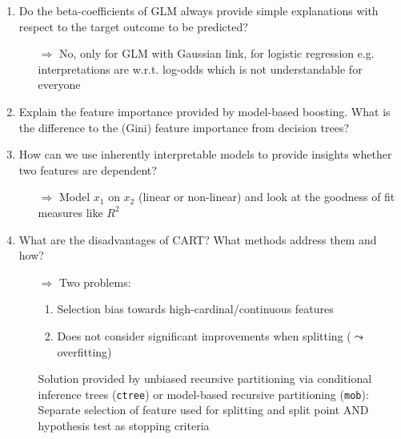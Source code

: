 \begin{enumerate}
\begin{itemize}
    	\end{itemize}
    	\item Do the beta-coefficients of GLM always provide simple explanations with respect to the target outcome to be predicted? 
    	\begin{itemize}
    		\item[$\Rightarrow$] No, only for GLM with Gaussian link, for logistic regression e.g. interpretations are w.r.t. log-odds which is not understandable for everyone
    	\end{itemize}
    	\item Explain the feature importance provided by model-based boosting. What is the difference to the (Gini) feature importance from decision trees?
    	\item How can we use inherently interpretable models to provide insights whether two features are dependent?
    	\begin{itemize}
    		\item[$\Rightarrow$] Model $x_1$ on $x_2$ (linear or non-linear) and look at the goodness of fit measures like $R^2$
    	\end{itemize}
    	\item What are the disadvantages of CART? What methods address them and how?
    	\begin{itemize}
    		\item[$\Rightarrow$] Two problems: 
    		\begin{enumerate}[1.]
    			\item Selection bias towards high-cardinal/continuous features 
    			\item Does not consider significant improvements when splitting ($\leadsto$ overfitting)
    		\end{enumerate}
    		Solution provided by unbiased recursive partitioning via conditional inference trees (\texttt{ctree}) or model-based recursive partitioning (\texttt{mob}): Separate selection of feature used for splitting and split point AND hypothesis test as stopping criteria 
    	\end{itemize}
	\end{enumerate}